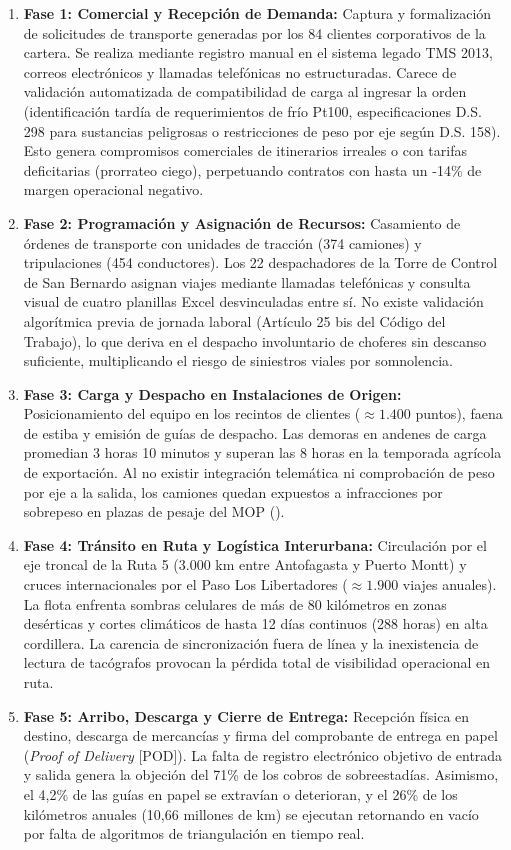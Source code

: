 \begin{enumerate}
  \item \textbf{Fase 1: Comercial y Recepción de Demanda:} Captura y formalización de solicitudes de transporte generadas por los 84 clientes corporativos de la cartera. Se realiza mediante registro manual en el sistema legado TMS 2013, correos electrónicos y llamadas telefónicas no estructuradas. Carece de validación automatizada de compatibilidad de carga al ingresar la orden (identificación tardía de requerimientos de frío Pt100, especificaciones D.S. 298 para sustancias peligrosas o restricciones de peso por eje según D.S. 158). Esto genera compromisos comerciales de itinerarios irreales o con tarifas deficitarias (prorrateo ciego), perpetuando contratos con hasta un -14\% de margen operacional negativo.
  \item \textbf{Fase 2: Programación y Asignación de Recursos:} Casamiento de órdenes de transporte con unidades de tracción (374 camiones) y tripulaciones (454 conductores). Los 22 despachadores de la Torre de Control de San Bernardo asignan viajes mediante llamadas telefónicas y consulta visual de cuatro planillas Excel desvinculadas entre sí. No existe validación algorítmica previa de jornada laboral (Artículo 25 bis del Código del Trabajo), lo que deriva en el despacho involuntario de choferes sin descanso suficiente, multiplicando el riesgo de siniestros viales por somnolencia.
  \item \textbf{Fase 3: Carga y Despacho en Instalaciones de Origen:} Posicionamiento del equipo en los recintos de clientes ($\approx 1.400$ puntos), faena de estiba y emisión de guías de despacho. Las demoras en andenes de carga promedian 3 horas 10 minutos y superan las 8 horas en la temporada agrícola de exportación. Al no existir integración telemática ni comprobación de peso por eje a la salida, los camiones quedan expuestos a infracciones por sobrepeso en plazas de pesaje del MOP ().
  \item \textbf{Fase 4: Tránsito en Ruta y Logística Interurbana:} Circulación por el eje troncal de la Ruta 5 (3.000 km entre Antofagasta y Puerto Montt) y cruces internacionales por el Paso Los Libertadores ($\approx 1.900$ viajes anuales). La flota enfrenta sombras celulares de más de 80 kilómetros en zonas desérticas y cortes climáticos de hasta 12 días continuos (288 horas) en alta cordillera. La carencia de sincronización fuera de línea y la inexistencia de lectura de tacógrafos provocan la pérdida total de visibilidad operacional en ruta.
  \item \textbf{Fase 5: Arribo, Descarga y Cierre de Entrega:} Recepción física en destino, descarga de mercancías y firma del comprobante de entrega en papel (\textit{Proof of Delivery} [POD]). La falta de registro electrónico objetivo de entrada y salida genera la objeción del 71\% de los cobros de sobreestadías. Asimismo, el 4,2\% de las guías en papel se extravían o deterioran, y el 26\% de los kilómetros anuales (10,66 millones de km) se ejecutan retornando en vacío por falta de algoritmos de triangulación en tiempo real.

\end{enumerate}
